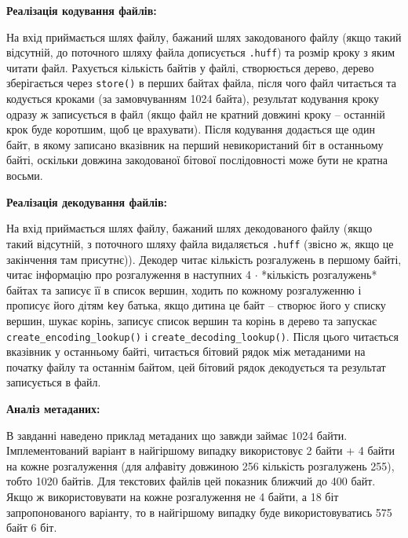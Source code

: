 \documentclass{article}
\def\code#1{\texttt{#1}}
\begin{document}
\textbf{Реалізація кодування файлів:}\\\indent

На вхід приймається шлях файлу, бажаний шлях закодованого файлу (якщо такий відсутній, до поточного шляху файла дописується \code{.huff}) та розмір кроку з яким читати файл. Рахується кількість байтів у файлі, створюється дерево, дерево зберігається через \code{store()} в перших байтах файла, після чого файл читається та кодується кроками (за замовчуванням 1024 байта), результат кодування кроку одразу ж записується в файл (якщо файл не кратний довжині кроку -- останній крок буде коротшим, щоб це врахувати). Після кодування додається ще один байт, в якому записано вказівник на перший невикористаний біт в останньому байті, оскільки довжина закодованої бітової послідовності може бути не кратна восьми.

\textbf{Реалізація декодування файлів:}\\\indent

На вхід приймається шлях файлу, бажаний шлях декодованого файлу (якщо такий відсутній, з поточного шляху файла видаляється \code{.huff} (звісно ж, якщо це закінчення там присутнє)). Декодер читає кількість розгалужень в першому байті, читає інформацію про розгалуження в наступних 4 $\cdot$ *кількість розгалужень* байтах та записує її в список вершин, ходить по кожному розгалуженню і прописує його дітям \code{key} батька, якщо дитина це байт -- створює його у списку вершин, шукає корінь, записує список вершин та корінь в дерево та запускає \code{create\_encoding\_lookup()} і \code{create\_decoding\_lookup()}. Після цього читається вказівник у останньому байті, читається бітовий рядок між метаданими на початку файлу та останнім байтом, цей бітовий рядок декодується та результат записується в файл.\\\indent

\newpage
\textbf{Аналіз метаданих:}\\\indent

В завданні наведено приклад метаданих що завжди займає 1024 байти. Імплементований варіант в найгіршому випадку використовує 2 байти + 4 байти на кожне розгалуження (для алфавіту довжиною 256 кількість розгалужень 255), тобто 1020 байтів. Для текстових файлів цей показник ближчий до 400 байт.\\\indent
Якщо ж використовувати на кожне розгалуження не 4 байти, а 18 біт запропонованого варіанту, то в найгіршому випадку буде використовуватись 575 байт 6 біт.\\\indent
\end{document}
